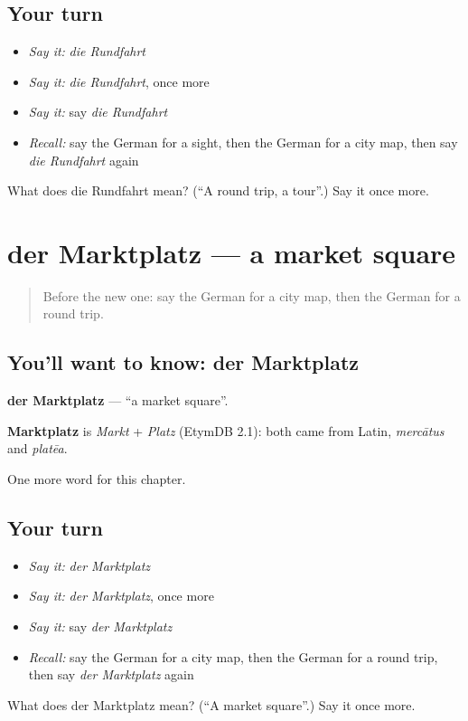 \subsection*{Your turn}
\begin{itemize}
\raggedright
  \item \emph{Say it:} \emph{die Rundfahrt}
  \item \emph{Say it:} \emph{die Rundfahrt}, once more
  \item \emph{Say it:} say \emph{die Rundfahrt}
  \item \emph{Recall:} say the German for a sight, then the German for a city map, then say \emph{die Rundfahrt} again
\end{itemize}

\begin{tcolorbox}[breakable,colback=teal!4,colframe=teal!35!black,title={Before you move on}]
What does die Rundfahrt mean? (\textquotedblleft{}A round trip, a tour\textquotedblright{}.) Say it once more.
\end{tcolorbox}
\section[der Marktplatz]{der Marktplatz — a market square}

\label{lesson:GE-C194-marktplatz}



\begin{quote}
Before the new one: say the German for a city map, then the German for a round trip.
\end{quote}

\subsection*{You'll want to know: der Marktplatz}
\textbf{der Marktplatz} — \textquotedblleft{}a market square\textquotedblright{}.

\begin{cousinweb}
\textbf{Marktplatz} is \emph{Markt} + \emph{Platz} (EtymDB 2.1): both came from Latin, \emph{mercātus} and \emph{platēa}.
\end{cousinweb}

\begin{grammarlens}[title={What you've built}]
One more word for this chapter.
\end{grammarlens}

\subsection*{Your turn}
\begin{itemize}
\raggedright
  \item \emph{Say it:} \emph{der Marktplatz}
  \item \emph{Say it:} \emph{der Marktplatz}, once more
  \item \emph{Say it:} say \emph{der Marktplatz}
  \item \emph{Recall:} say the German for a city map, then the German for a round trip, then say \emph{der Marktplatz} again
\end{itemize}

\begin{tcolorbox}[breakable,colback=teal!4,colframe=teal!35!black,title={Before you move on}]
What does der Marktplatz mean? (\textquotedblleft{}A market square\textquotedblright{}.) Say it once more.
\end{tcolorbox}
